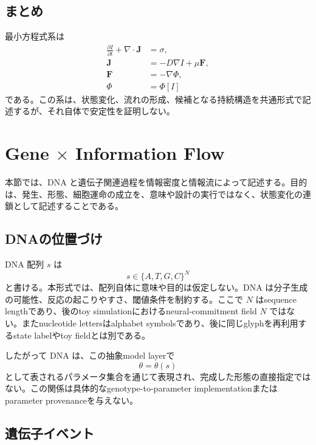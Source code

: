 \documentclass[11pt]{ltjsarticle}
\newcommand{\I}{I}
\newcommand{\J}{\mathbf{J}}
\newcommand{\PhiI}{\Phi}
\begin{document}
\subsection{まとめ}

最小方程式系は
\begin{align}
  \frac{\partial \I}{\partial t}+\nabla\cdot\J&=\sigma,\\
  \J&=-D\nabla\I+\mu\mathbf{F},\\
  \mathbf{F}&=-\nabla\PhiI,\\
  \PhiI&=\PhiI[\I]
\end{align}
である。この系は、状態変化、流れの形成、候補となる持続構造を共通形式で記述するが、それ自体で安定性を証明しない。

\section{Gene \texorpdfstring{\(\times\)}{x} Information Flow}

本節では、DNA と遺伝子関連過程を情報密度と情報流によって記述する。目的は、発生、形態、細胞運命の成立を、意味や設計の実行ではなく、状態変化の連鎖として記述することである。

\subsection{DNAの位置づけ}

DNA 配列 \(s\) は
\begin{equation}
  s\in\{A,T,G,C\}^{N}
\end{equation}
と書ける。本形式では、配列自体に意味や目的は仮定しない。DNA は分子生成の可能性、反応の起こりやすさ、閾値条件を制約する。ここで \(N\) はsequence lengthであり、後のtoy simulationにおけるneural-commitment field \(N\) ではない。またnucleotide lettersはalphabet symbolsであり、後に同じglyphを再利用するstate labelやtoy fieldとは別である。

したがって DNA は、この抽象model layerで
\begin{equation}
  \theta=\theta(s)
\end{equation}
として表されるパラメータ集合を通じて表現され、完成した形態の直接指定ではない。この関係は具体的なgenotype-to-parameter implementationまたはparameter provenanceを与えない。

\subsection{遺伝子イベント}
\end{document}
